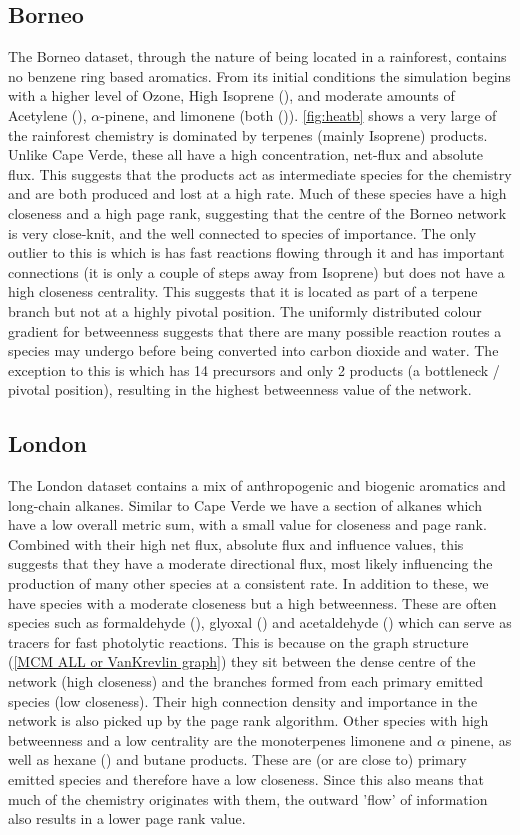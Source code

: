 \subsection*{Borneo}
The Borneo dataset, through the nature of being located in a rainforest, contains no benzene ring based aromatics. From its initial conditions the simulation begins with a higher level of Ozone, High Isoprene (), and moderate amounts of Acetylene (), $\alpha$-pinene, and limonene (both ()). \autoref{fig:heatb} shows a very large of the rainforest chemistry is dominated by terpenes (mainly Isoprene) products. Unlike Cape Verde, these all have a high concentration, net-flux and absolute flux. This suggests that the products act as intermediate species for the chemistry and are both produced and lost at a high rate. Much of these species have a high closeness and a high page rank, suggesting that the centre of the Borneo network is very close-knit, and the well connected to species of importance. The only outlier to this is  which is has fast reactions flowing through it and has important connections (it is only a couple of steps away from Isoprene) but does not have a high closeness centrality. This suggests that it is located as part of a terpene branch but not at a highly pivotal position. The uniformly distributed colour gradient for betweenness suggests that there are many possible reaction routes a species may undergo before being converted into carbon dioxide and water. The exception to this is  which has 14 precursors and only 2 products (a bottleneck / pivotal position), resulting in the highest betweenness value of the network. 


\subsection*{London}
The London dataset contains a mix of anthropogenic and biogenic aromatics and long-chain alkanes. Similar to Cape Verde we have a section of alkanes which have a low overall metric sum, with a small value for closeness and page rank. Combined with their high net flux, absolute flux and influence values, this suggests that they have a moderate directional flux, most likely influencing the production of many other species at a consistent rate. In addition to these, we have species with a moderate closeness but a high betweenness. These are often species such as formaldehyde (), glyoxal () and acetaldehyde () which can serve as tracers for fast photolytic reactions. This is because on the graph structure (\autoref{MCM ALL or VanKrevlin graph}) they sit between the dense centre of the network (high closeness) and the branches formed from each primary emitted species (low closeness). Their high connection density and importance in the network is also picked up by the page rank algorithm. Other species with high betweenness and a low centrality are the monoterpenes limonene and $\alpha$ pinene, as well as hexane () and butane products. These are (or are close to) primary emitted species and therefore have a low closeness. Since this also means that much of the chemistry originates with them, the outward 'flow' of information also results in a lower page rank value. 

